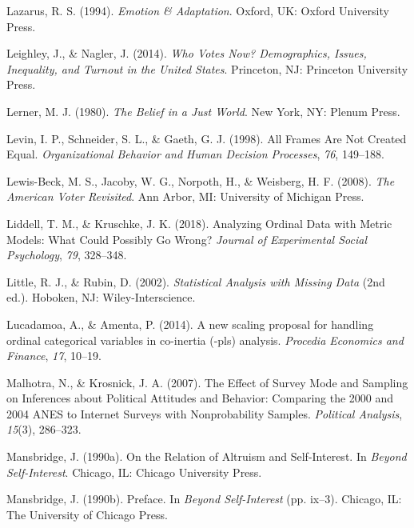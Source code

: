 \documentclass[12pt,econ]{sources/authesis}
\begin{document}
\leavevmode\hypertarget{ref-lazarus_1994_emotion}{}%
Lazarus, R. S. (1994). \emph{Emotion \& Adaptation}. Oxford, UK: Oxford University Press.

\leavevmode\hypertarget{ref-leighley_who_2014}{}%
Leighley, J., \& Nagler, J. (2014). \emph{Who Votes Now? Demographics, Issues, Inequality, and Turnout in the United States}. Princeton, NJ: Princeton University Press.

\leavevmode\hypertarget{ref-lerner_belief_1980}{}%
Lerner, M. J. (1980). \emph{The Belief in a Just World}. New York, NY: Plenum Press.

\leavevmode\hypertarget{ref-levin_1998_frames}{}%
Levin, I. P., Schneider, S. L., \& Gaeth, G. J. (1998). All Frames Are Not Created Equal. \emph{Organizational Behavior and Human Decision Processes}, \emph{76}, 149--188.

\leavevmode\hypertarget{ref-lewis-beck_2008_american}{}%
Lewis-Beck, M. S., Jacoby, W. G., Norpoth, H., \& Weisberg, H. F. (2008). \emph{The American Voter Revisited}. Ann Arbor, MI: University of Michigan Press.

\leavevmode\hypertarget{ref-liddell_2018_analyzing}{}%
Liddell, T. M., \& Kruschke, J. K. (2018). Analyzing Ordinal Data with Metric Models: What Could Possibly Go Wrong? \emph{Journal of Experimental Social Psychology}, \emph{79}, 328--348.

\leavevmode\hypertarget{ref-little_2002_statistical}{}%
Little, R. J., \& Rubin, D. (2002). \emph{Statistical Analysis with Missing Data} (2nd ed.). Hoboken, NJ: Wiley-Interscience.

\leavevmode\hypertarget{ref-lucadamoa_2014_scaling}{}%
Lucadamoa, A., \& Amenta, P. (2014). A new scaling proposal for handling ordinal categorical variables in co-inertia (-pls) analysis. \emph{Procedia Economics and Finance}, \emph{17}, 10--19.

\leavevmode\hypertarget{ref-malhotra_2007_effect}{}%
Malhotra, N., \& Krosnick, J. A. (2007). The Effect of Survey Mode and Sampling on Inferences about Political Attitudes and Behavior: Comparing the 2000 and 2004 ANES to Internet Surveys with Nonprobability Samples. \emph{Political Analysis}, \emph{15}(3), 286--323.

\leavevmode\hypertarget{ref-mansbridge_1990_relation}{}%
Mansbridge, J. (1990a). On the Relation of Altruism and Self-Interest. In \emph{Beyond Self-Interest}. Chicago, IL: Chicago University Press.

\leavevmode\hypertarget{ref-mansbridge_preface_1990}{}%
Mansbridge, J. (1990b). Preface. In \emph{Beyond Self-Interest} (pp. ix--3). Chicago, IL: The University of Chicago Press.
\end{document}

